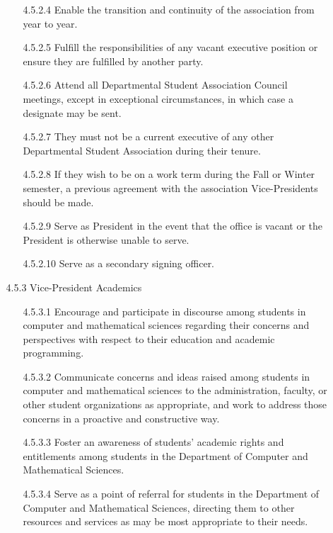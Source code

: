 \documentclass[12pt,a4paper]{article}
\begin{document}
\begin{enumerate}
\begin{enumerate}
\begin{enumerate}
\item[4.5.2.4] Enable the transition and continuity of the association from year to year.

\item[4.5.2.5] Fulfill the responsibilities of any vacant executive position or ensure they are fulfilled by another party.

\item[4.5.2.6] Attend all Departmental Student Association Council meetings, except in exceptional circumstances, in which case a designate may be sent.

\item[4.5.2.7] They must not be a current executive of any other Departmental Student Association during their tenure.

\item[4.5.2.8] If they wish to be on a work term during the Fall or Winter semester, a previous agreement with the association Vice-Presidents should be made.

\item[4.5.2.9] Serve as President in the event that the office is vacant or the President is otherwise unable to serve.

\item[4.5.2.10] Serve as a secondary signing officer.
\end{enumerate}

\item[4.5.3] Vice-President Academics

\begin{enumerate}
\item[4.5.3.1] Encourage and participate in discourse among students in computer and mathematical sciences regarding their concerns and perspectives with respect to their education and academic programming.

\item[4.5.3.2] Communicate concerns and ideas raised among students in computer and mathematical sciences to the administration, faculty, or other student organizations as appropriate, and work to address those concerns in a proactive and constructive way.

\item[4.5.3.3] Foster an awareness of students' academic rights and entitlements among students in the Department of Computer and Mathematical Sciences.

\item[4.5.3.4] Serve as a point of referral for students in the Department of Computer and Mathematical Sciences, directing them to other resources and services as may be most appropriate to their needs.


\end{enumerate}
\end{enumerate}
\end{enumerate}
\end{document}
